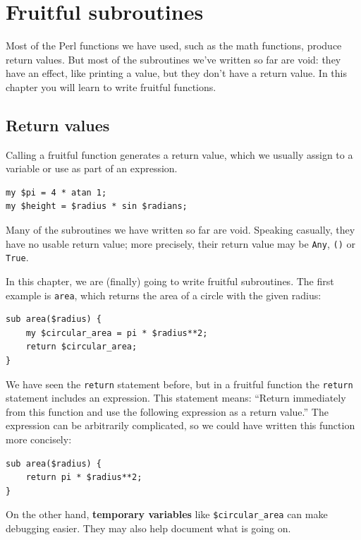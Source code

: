 
\chapter{Fruitful subroutines}
\label{fruitchap}

Most of the Perl functions we have used, such as the math
functions, produce return values.  But most of the subroutines 
we've written so far are void: they have an effect, like printing 
a value, but they don't have a return value.  In
this chapter you will learn to write fruitful functions.


\section{Return values}

Calling a fruitful function generates a return
value, which we usually assign to a variable or use as part of an
expression.

\begin{verbatim}
my $pi = 4 * atan 1;
my $height = $radius * sin $radians;
\end{verbatim}
%
Many of the subroutines we have written so far are void.  
Speaking casually,
they have no usable return value; more precisely,
their return value may be {\tt Any}, {\tt ()} or {\tt True}.

In this chapter, we are (finally) going to write fruitful subroutines.
The first example is {\tt area}, which returns the area of a circle
with the given radius:

\begin{verbatim}
sub area($radius) {
    my $circular_area = pi * $radius**2;
    return $circular_area;
}
\end{verbatim}
%
We have seen the {\tt return} statement before, but in a fruitful
function the {\tt return} statement includes
an expression.  This statement means: ``Return immediately from
this function and use the following expression as a return value.''
The expression can be arbitrarily complicated, so we could
have written this function more concisely:

\begin{verbatim}
sub area($radius) {
    return pi * $radius**2;
}
\end{verbatim}
%
On the other hand, {\bf temporary variables} like 
\verb'$circular_area' can make debugging easier. They 
may also help document what is going on.

